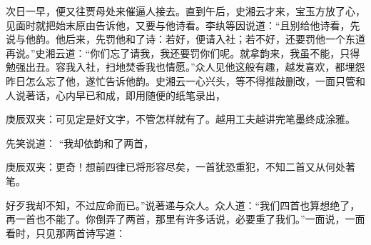 \begin{parag}
    次日一早，便又往贾母处来催逼人接去。直到午后，史湘云才来，宝玉方放了心，见面时就把始末原由告诉他，又要与他诗看。李纨等因说道：“且别给他诗看，先说与他韵。他后来，先罚他和了诗：若好，便请入社；若不好，还要罚他一个东道再说。”史湘云道：“你们忘了请我，我还要罚你们呢。就拿韵来，我虽不能，只得勉强出丑。容我入社，扫地焚香我也情愿。”众人见他这般有趣，越发喜欢，都埋怨昨日怎么忘了他，遂忙告诉他韵。史湘云一心兴头，等不得推敲删改，一面只管和人说著话，心内早已和成，即用随便的纸笔录出，\begin{note}庚辰双夹：可见定是好文字，不管怎样就有了。越用工夫越讲完笔墨终成涂雅。\end{note}先笑说道： “我却依韵和了两首，\begin{note}庚辰双夹：更奇！想前四律已将形容尽矣，一首犹恐重犯，不知二首又从何处著笔。\end{note}好歹我却不知，不过应命而已。”说著递与众人。众人道：“我们四首也算想绝了，再一首也不能了。你倒弄了两首，那里有许多话说，必要重了我们。”一面说，一面看时，只见那两首诗写道：
\end{parag}


